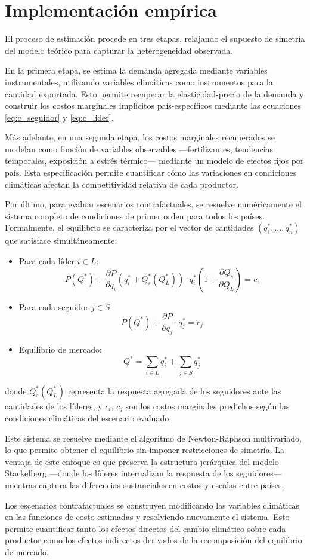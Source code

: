 \section{Implementación empírica}

El proceso de estimación procede en tres etapas, relajando el supuesto de simetría del modelo teórico para capturar la heterogeneidad observada.

En la primera etapa, se estima la demanda agregada mediante variables instrumentales, utilizando variables climáticas como instrumentos para la cantidad exportada. Esto permite recuperar la elasticidad-precio de la demanda y construir los costos marginales implícitos país-específicos mediante las ecuaciones \eqref{eq:c_seguidor} y \eqref{eq:c_lider}.

Más adelante, en una segunda etapa, los costos marginales recuperados se modelan como función de variables observables —fertilizantes, tendencias temporales, exposición a estrés térmico—  mediante un modelo de efectos fijos por país. Esta especificación permite cuantificar cómo las variaciones en condiciones climáticas afectan la competitividad relativa de cada productor.

Por último, para evaluar escenarios contrafactuales, se resuelve numéricamente el sistema completo de condiciones de primer orden para todos los países. Formalmente, el equilibrio se caracteriza por el vector de cantidades $(q_1^*, ..., q_n^*)$ que satisface simultáneamente:

\begin{itemize}
    \item Para cada líder $i \in L$: 
    $$P(Q^*) + \frac{\partial P}{\partial q_i}\left(q_i^* + Q_s^*(Q_L^*)\right) 
    \cdot q_i^* \left(1 + \frac{\partial Q_s}{\partial Q_L}\right) = c_i$$
    
    \item Para cada seguidor $j \in S$: 
    $$P(Q^*) + \frac{\partial P}{\partial q_j} \cdot q_j^* = c_j$$
    
    \item Equilibrio de mercado: 
    $$Q^* = \sum_{i \in L} q_i^* + \sum_{j \in S} q_j^*$$
\end{itemize}

donde $Q_s^*(Q_L^*)$ representa la respuesta agregada de los seguidores ante las cantidades de los líderes, y $c_i$, $c_j$ son los costos marginales predichos según las condiciones climáticas del escenario evaluado.

Este sistema se resuelve mediante el algoritmo de Newton-Raphson multivariado, lo que permite obtener el equilibrio sin imponer restricciones de simetría. La ventaja de este enfoque es que preserva la estructura jerárquica del modelo Stackelberg —donde los líderes internalizan la respuesta de los seguidores— mientras captura las diferencias sustanciales en costos y escalas entre países.

Los escenarios contrafactuales se construyen modificando las variables climáticas en las funciones de costo estimadas y resolviendo nuevamente el sistema. Esto permite cuantificar tanto los efectos directos del cambio climático sobre cada productor como los efectos indirectos derivados de la recomposición del equilibrio de mercado.